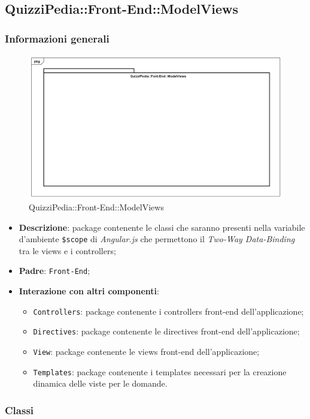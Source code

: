 \newpage

\subsection{QuizziPedia::Front-End::ModelViews}
\subsubsection{Informazioni generali}
\label{QuizziPedia::Front-End::ModelViews}
\begin{figure}
	\centering
	\includegraphics[scale=0.45]{UML/Package/QuizziPedia_Front-End_ModelViews.png}
	\caption{QuizziPedia::Front-End::ModelViews}
\end{figure}
\begin{itemize}
	\item \textbf{Descrizione}: package contenente le classi che saranno presenti nella variabile d'ambiente \texttt{\$scope} di \textit{Angular.js} che permettono il \textit{Two-Way Data-Binding} tra le views e i controllers;
	\item \textbf{Padre}: \texttt{Front-End};
	\item \textbf{Interazione con altri componenti}:
	\begin{itemize}
		\item \texttt{Controllers}: package contenente i controllers front-end dell'applicazione;
		\item \texttt{Directives}: package contenente le directives front-end dell'applicazione;
		\item \texttt{View}: package contenente le views front-end dell'applicazione;
		\item \texttt{Templates}: package contenente i templates necessari per la creazione dinamica delle viste per le domande.
	\end{itemize}
\end{itemize}
\subsubsection{Classi}
	
	
